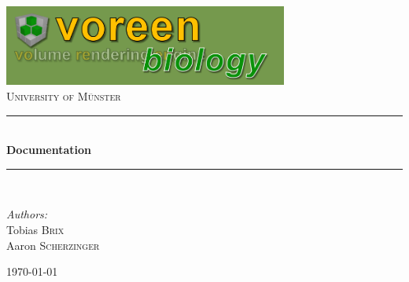 \begin{titlepage}
\begin{center}

\includegraphics[width=0.7\textwidth]{images/logo_bio.png}~\\[1cm]

\textsc{\LARGE University of M\"unster}\\[1.5cm]


\rule{\linewidth}{0.5mm} \\[0.4cm]
{ \huge \bfseries Documentation\\[0.4cm] }

\rule{\linewidth}{0.5mm} \\[1.5cm]

\begin{minipage}{0.4\textwidth}
\begin{flushleft} \large
\emph{Authors:}\\
Tobias \textsc{Brix}\\
Aaron \textsc{Scherzinger}
\end{flushleft}
\end{minipage}

\vfill

{\large \today}

\end{center}
\end{titlepage}
\newpage



